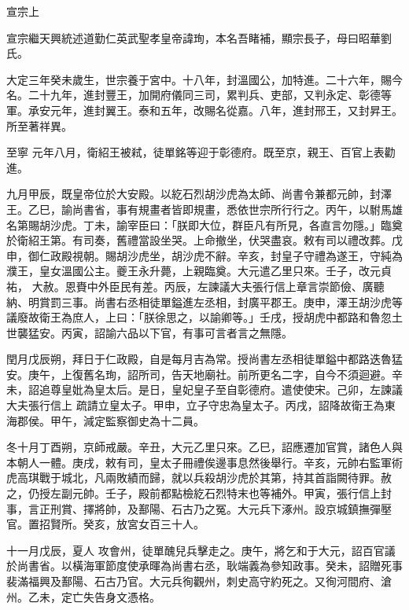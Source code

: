 
\begin{pinyinscope}

 宣宗上



 宣宗繼天興統述道勤仁英武聖孝皇帝諱珣，本名吾睹補，顯宗長子，母曰昭華劉氏。



 大定三年癸未歲生，世宗養于宮中。十八年，封溫國公，加特進。二十六年，賜今名。二十九年，進封豐王，加開府儀同三司，累判兵、吏部，又判永定、彰德等軍。承安元年，進封翼王。泰和五年，改賜名從嘉。八年，進封邢王，又封昇王。所至著祥異。



 至寧
 元年八月，衛紹王被弒，徒單銘等迎于彰德府。既至京，親王、百官上表勸進。



 九月甲辰，既皇帝位於大安殿。以紇石烈胡沙虎為太師、尚書令兼都元帥，封澤王。乙巳，諭尚書省，事有規畫者皆即規畫，悉依世宗所行行之。丙午，以駙馬雄名第賜胡沙虎。丁未，諭宰臣曰：「朕即大位，群臣凡有所見，各直言勿隱。」臨奠於衛紹王第。有司奏，舊禮當設坐哭。上命撤坐，伏哭盡哀。敕有司以禮改葬。戊申，御仁政殿視朝。賜胡沙虎坐，胡沙虎不辭。辛亥，封皇子守禮為遂王，守純為濮王，皇女溫國公主。夔王永升薨，上親臨奠。大元遣乙里只來。壬子，改元貞祐，
 大赦。恩賚中外臣民有差。丙辰，左諫議大夫張行信上章言崇節儉、廣聽納、明賞罰三事。尚書右丞相徒單鎰進左丞相，封廣平郡王。庚申，澤王胡沙虎等議廢故衛王為庶人，上曰：「朕徐思之，以諭卿等。」壬戌，授胡虎中都路和魯忽土世襲猛安。丙寅，詔諭六品以下官，有事可言者言之無隱。



 閏月戊辰朔，拜日于仁政殿，自是每月吉為常。授尚書左丞相徒單鎰中都路迭魯猛安。庚午，上復舊名珣，詔所司，告天地廟社。前所更名二字，自今不須迴避。辛未，詔追尊皇妣為皇太后。是日，皇妃皇子至自彰德府。遣使使宋。己卯，左諫議大夫張行信上
 疏請立皇太子。甲申，立子守忠為皇太子。丙戌，詔降故衛王為東海郡侯。甲午，減定監察御史為十二員。



 冬十月丁酉朔，京師戒嚴。辛丑，大元乙里只來。乙巳，詔應遷加官賞，諸色人與本朝人一體。庚戌，敕有司，皇太子冊禮俟邊事息然後舉行。辛亥，元帥右監軍術虎高琪戰于城北，凡兩敗績而歸，就以兵殺胡沙虎於其第，持其首詣闕待罪。赦之，仍授左副元帥。壬子，殿前都點檢紇石烈特末也等補外。甲寅，張行信上封事，言正刑賞、擇將帥，及鄯陽、石古乃之冤。大元兵下涿州。設京城鎮撫彈壓官。置招賢所。癸亥，放宮女百三十人。



 十一月戊辰，夏人
 攻會州，徒單醜兒兵擊走之。庚午，將乞和于大元，詔百官議於尚書省。以橫海軍節度使承暉為尚書右丞，耿端義為參知政事。癸未，詔贈死事裴滿福興及鄯陽、石古乃官。大元兵徇觀州，刺史高守約死之。又徇河間府、滄州。乙未，定亡失告身文憑格。




\end{pinyinscope}
